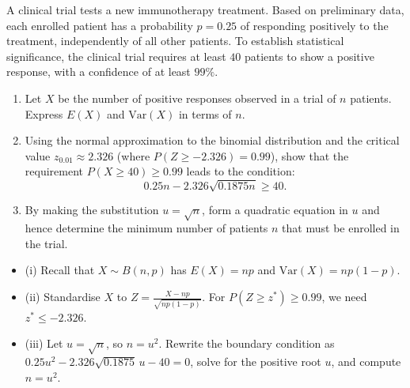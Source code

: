 \begin{problem}
A clinical trial tests a new immunotherapy treatment. Based on preliminary data, each enrolled patient has a probability $p = 0{.}25$ of responding positively to the treatment, independently of all other patients. To establish statistical significance, the clinical trial requires at least $40$ patients to show a positive response, with a confidence of at least $99\%$.
\begin{enumerate}[label=\textbf{(\roman*)}]
  \item Let $X$ be the number of positive responses observed in a trial of $n$ patients. Express $E(X)$ and $\mathrm{Var}(X)$ in terms of $n$.
  \item Using the normal approximation to the binomial distribution and the critical value $z_{0{.}01} \approx 2{.}326$ (where $P(Z \geq -2{.}326) = 0{.}99$), show that the requirement $P(X \geq 40) \geq 0{.}99$ leads to the condition:
  \[
  0{.}25n - 2{.}326\sqrt{0{.}1875n} \geq 40.
  \]
  \item By making the substitution $u = \sqrt{n}$, form a quadratic equation in $u$ and hence determine the minimum number of patients $n$ that must be enrolled in the trial.
\end{enumerate}
\end{problem}

\begin{hint}
\begin{itemize}[leftmargin=*]
  \item (i) Recall that $X \sim B(n, p)$ has $E(X) = np$ and $\mathrm{Var}(X) = np(1-p)$.
  \item (ii) Standardise $X$ to $Z = \frac{X - np}{\sqrt{np(1-p)}}$. For $P(Z \geq z^*) \geq 0{.}99$, we need $z^* \leq -2{.}326$.
  \item (iii) Let $u = \sqrt{n}$, so $n = u^2$. Rewrite the boundary condition as $0{.}25u^2 - 2{.}326\sqrt{0{.}1875}\,u - 40 = 0$, solve for the positive root $u$, and compute $n = u^2$.
\end{itemize}
\end{hint}

